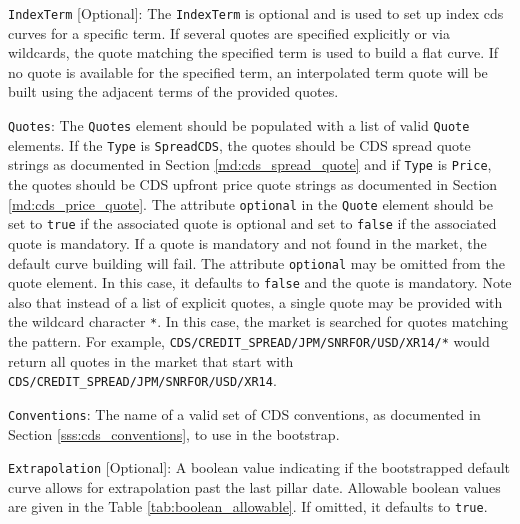 \item \lstinline!IndexTerm! [Optional]: The \lstinline!IndexTerm! is optional and is used to set up index cds curves for
  a specific term. If several quotes are specified explicitly or via wildcards, the quote matching the specified term is
  used to build a flat curve. If no quote is available for the specified term, an interpolated term quote will be built
  using the adjacent terms of the provided quotes.

\item \lstinline!Quotes!:
The \lstinline!Quotes! element should be populated with a list of valid \lstinline!Quote! elements. If the \lstinline!Type! is \lstinline!SpreadCDS!, the quotes should be CDS spread quote strings as documented in Section \ref{md:cds_spread_quote} and if \lstinline!Type! is \lstinline!Price!, the quotes should be CDS upfront price quote strings as documented in Section \ref{md:cds_price_quote}. The attribute \lstinline!optional! in the \lstinline!Quote! element should be set to \lstinline!true! if the associated quote is optional and set to \lstinline!false! if the associated quote is mandatory. If a quote is mandatory and not found in the market, the default curve building will fail. The attribute \lstinline!optional! may be omitted from the quote element. In this case, it defaults to \lstinline!false! and the quote is mandatory. Note also that instead of a list of explicit quotes, a single quote may be provided with the wildcard character \lstinline!*!. In this case, the market is searched for quotes matching the pattern. For example, \lstinline!CDS/CREDIT_SPREAD/JPM/SNRFOR/USD/XR14/*! would return all quotes in the market that start with \lstinline!CDS/CREDIT_SPREAD/JPM/SNRFOR/USD/XR14!.

\item \lstinline!Conventions!:
The name of a valid set of CDS conventions, as documented in Section \ref{sss:cds_conventions}, to use in the bootstrap.

\item \lstinline!Extrapolation! [Optional]:
A boolean value indicating if the bootstrapped default curve allows for extrapolation past the last pillar date. Allowable boolean values are given in the Table \ref{tab:boolean_allowable}. If omitted, it defaults to \lstinline!true!.

